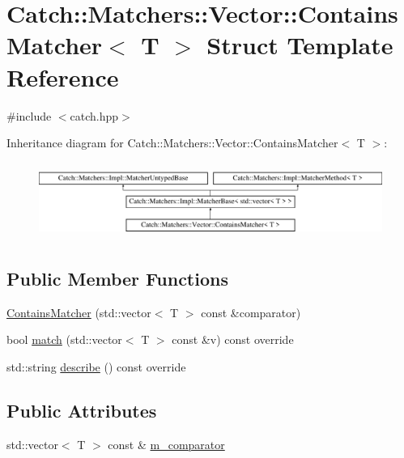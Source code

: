\hypertarget{struct_catch_1_1_matchers_1_1_vector_1_1_contains_matcher}{}\section{Catch\+::Matchers\+::Vector\+::Contains\+Matcher$<$ T $>$ Struct Template Reference}
\label{struct_catch_1_1_matchers_1_1_vector_1_1_contains_matcher}


{\ttfamily \#include $<$catch.\+hpp$>$}

Inheritance diagram for Catch\+::Matchers\+::Vector\+::Contains\+Matcher$<$ T $>$\+:\begin{figure}[H]
\begin{center}
\leavevmode
\includegraphics[height=2.514970cm]{struct_catch_1_1_matchers_1_1_vector_1_1_contains_matcher}
\end{center}
\end{figure}
\subsection*{Public Member Functions}
\begin{DoxyCompactItemize}
\item 
\mbox{\hyperlink{struct_catch_1_1_matchers_1_1_vector_1_1_contains_matcher_ad8e92c8399be6dce75bb5702cdfab700}{Contains\+Matcher}} (std\+::vector$<$ T $>$ const \&comparator)
\item 
bool \mbox{\hyperlink{struct_catch_1_1_matchers_1_1_vector_1_1_contains_matcher_afd33467ae48a41a634572b41b053f67f}{match}} (std\+::vector$<$ T $>$ const \&v) const override
\item 
std\+::string \mbox{\hyperlink{struct_catch_1_1_matchers_1_1_vector_1_1_contains_matcher_abe6a9ea3d6506c9a1f75ff524f35832e}{describe}} () const override
\end{DoxyCompactItemize}
\subsection*{Public Attributes}
\begin{DoxyCompactItemize}
\item 
std\+::vector$<$ T $>$ const  \& \mbox{\hyperlink{struct_catch_1_1_matchers_1_1_vector_1_1_contains_matcher_a83d051166e4ed0d535219ad6ee99abb2}{m\+\_\+comparator}}
\end{DoxyCompactItemize}
